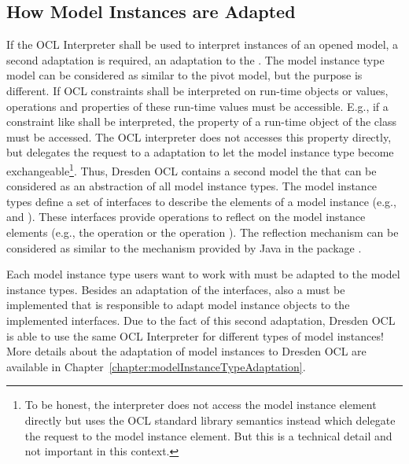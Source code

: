 \subsection{How Model Instances are Adapted}
\label{architecture:modelInstanceAdaptation}

If the \acs{OCL} Interpreter shall be used to interpret instances of an opened 
model, a second adaptation is required, an adaptation to the . The model instance type model can be considered as similar
to the pivot model, but the purpose is different. If \acs{OCL} constraints shall
be interpreted on run-time objects or values, operations and properties of these
run-time values must be accessible. E.g., if a constraint like  shall be interpreted, the property  of a
run-time object of the class  must be accessed. The \acs{OCL} 
interpreter does not accesses this property directly, but delegates the request 
to a  adaptation to let the model instance type
become exchangeable\footnote{To be honest, the interpreter does not access the
model instance element directly but uses the \acs{OCL} standard library
semantics instead which delegate the request to the model instance element. But
this is a technical detail and not important in this context.}. Thus,
Dresden OCL contains a second model the 
that can be considered as an abstraction of all model instance types. The model 
instance types define a set of interfaces to describe the elements of a model 
instance (e.g.,  and 
). These interfaces provide operations to reflect on 
the model instance elements (e.g., the operation
 or the operation 
). The reflection mechanism can be 
considered as similar to the mechanism provided by Java in the package 
.

Each model instance type users want to work with must be adapted to the model 
instance types. Besides an adaptation of the interfaces, also a 
 must be implemented that is responsible to adapt 
model instance objects to the implemented interfaces. Due to the fact of this 
second adaptation, Dresden OCL is able to use the same \acs{OCL} Interpreter for
different types of model instances! More details about the adaptation of model 
instances to Dresden OCL are available in 
Chapter~\ref{chapter:modelInstanceTypeAdaptation}.


